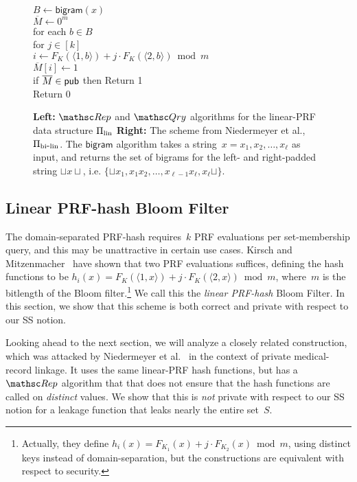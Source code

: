 \begin{figure}[tp]
{\medskip
{}\\
$B \gets \mathsf{bigram}(x)$\\
$\overline{M} \gets 0^m$\\
for each $b \in B$\\
\nudge for $j \in [k]$\\
\nudge\nudge $i \gets F_{K}(\langle 1,b \rangle)+j\cdot F_{K}(\langle 2,b \rangle) \bmod m$\\
\nudge\nudge $\overline{M}[i] \gets 1$\\
if $\overline{M} \in {\sf pub}$ then Return 1 \\
Return 0
}
\caption{{\bf Left:} $\Rep$ and $\Qry$ algorithms for the linear-PRF
  data structure $\Pi_{\mathrm{lin}}$ {\bf Right:}
The scheme from Niedermeyer et al.\cite{xxx}, $\Pi_{\mathrm{bi}\mbox{-}\mathrm{lin}}$. The $\mathsf{bigram}$
algorithm takes a string~$x=x_1,x_2,\ldots,x_\ell$ as input, and
returns the set of bigrams for the left- and right-padded string
$\sqcup x \sqcup$, i.e. $\{\sqcup x_1, x_1x_2,\ldots,x_{\ell-1}x_\ell,x_\ell\sqcup\}$.
}
\label{fig:lin-and-bi-lin}
\label{fig:niedermeyer}
\end{figure}

\subsection{Linear PRF-hash Bloom Filter }
The domain-separated PRF-hash requires~$k$ PRF evaluations per set-membership query, and this may be unattractive in certain use cases.  Kirsch and Mitzenmacher~\cite{xxx} have shown that two PRF evaluations suffices, defining the hash functions to be $h_i(x)=F_K(\langle 1,x \rangle) + j\cdot F_K(\langle 2,x \rangle) \bmod m$, where~$m$ is the bitlength of the Bloom filter.\footnote{Actually, they define $h_i(x)=F_{K_1}(x)  + j\cdot F_{K_2}(x) \bmod m$, using distinct keys instead of domain-separation, but the constructions are equivalent with respect to security.} We call this the \emph{linear PRF-hash} Bloom Filter.  In this section, we show that this scheme is both correct and private with respect to our SS notion.

Looking ahead to the next section, we will analyze a closely related construction, which was attacked by Niedermeyer et al.~\cite{xxx} in the context of private medical-record linkage.  It uses the same linear-PRF hash functions, but has a $\Rep$ algorithm that that does not ensure that the hash functions are called on \emph{distinct} values.  We show that this is \emph{not} private with respect to our SS notion for a leakage function that leaks nearly the entire set~$S$. 

